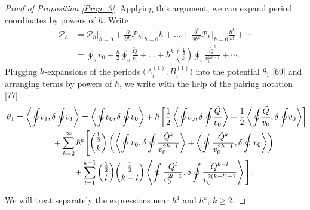 \documentclass[10pt,a4paper]{article}
\numberwithin{equation}{section}
\theoremstyle{definition}
\begin{document}
\begin{proof}[Proof of Proposition \ref{Prop_3}]
Applying this argument, we can expand period coordinates by powers of $\hbar.$ Write
\begin{align*}%
\mathcal{P}_{\hbar}& = \mathcal{P}_{\hbar}\Big|_{\hbar=0}+ \frac{\partial}{\partial \hbar}\mathcal{P}_{\hbar}\Big|_{\hbar=0}\hbar+\dots +\frac{\partial^k}{\partial \hbar^k}\mathcal{P}_{\hbar}\Big|_{\hbar=0}\frac{\hbar^k}{k!}+\cdots\\
& =\oint_{s} {v_0} + \frac{\hbar}{2}\oint_{s} \frac{\tilde{Q}}{ v_0}+\dots +\hbar^k\binom{\frac{1}{2}}{k}\oint_{s}\frac{\tilde{Q}^k}{v_0^{2k-1}}+\cdots.
\end{align*}
Plugging $\hbar$-expansions of the periods $\big(A^{(1)}_i,B^{(1)}_i\big)$ into the potential $\theta_1$ \eqref{69} and arranging terms by powers of $\hbar$, we write with the help of the pairing notation \eqref{77}:
\begin{gather}\label{105}
\theta_1=\left\langle \oint\! v_{1}, \delta \oint\! v_{1}\right\rangle =\left\langle \oint\! v_0, \delta \oint\! v_0\right\rangle + \hbar \left[\frac{1}{2}\left\langle \oint \!v_0, \delta \oint\! \frac{\tilde{Q}}{v_0}\right\rangle +\frac{1}{2}\left\langle \oint\! \frac{\tilde{Q}}{v_0}, \delta \oint\! v_0\right\rangle \right]\!\!\!\\
\hphantom{\theta_1=}{}
+\sum^{\infty}_{k=2}\hbar^k\Bigg[\binom{\frac{1}{2}}{k}\left(\left\langle \oint v_0,\delta \oint \frac{\tilde{Q}^k}{v_0^{2k-1}}\right\rangle +\left\langle \oint \frac{\tilde{Q}^k}{v_0^{2k-1}},\delta \oint v_0\right\rangle \right)\nonumber
\\
\hphantom{\theta_1=}{}
+\sum^{k-1}_{l=1} \binom{\frac{1}{2}}{l} \binom{\frac{1}{2}}{k-l}
\left\langle \oint \frac{\tilde{Q}^l}{v_0^{2l-1}}, \delta \oint \frac{\tilde{Q}^{k-l}}{v_0^{2(k-l)-1}} \right\rangle \Bigg].\label{106}
\end{gather}

We will treat separately the expressions near $\hbar^1$ and $\hbar^k$, $k \geq 2$.


\end{proof}
\end{document}
